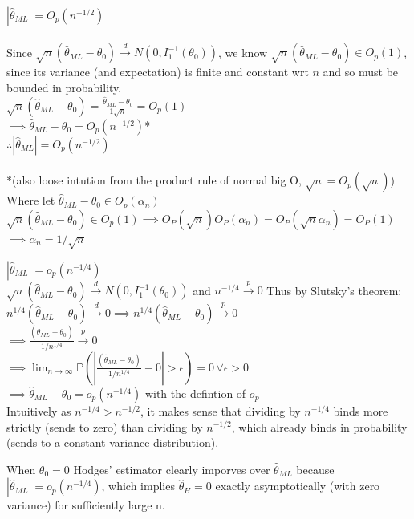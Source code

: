 \documentclass[DIV=14,titlepage=false]{scrreprt}
\begin{document}
\begin{prop}
\(|\hat{\theta}_{ML}|=O_p(n^{-1/2})\)
\\ \\ Since \(\sqrt{n}(\hat{\theta}_{ML}-\theta_0)\xrightarrow{d}N(0,I_1^{-1}(\theta_0))\), we know \(\sqrt{n}(\hat{\theta}_{ML}-\theta_0) \in O_p(1)\), since its variance (and expectation) is finite and constant wrt \(n\) and so must be bounded in probability.
\\ \(\sqrt{n}(\hat{\theta}_{ML}-\theta_0)=\frac{\hat{\theta}_{ML}-\theta_0}{1\sqrt{n}}=O_p(1)\)
\\ \(\implies \hat{\theta}_{ML}-\theta_0=O_p(n^{-1/2})\)* 
\\ \(\therefore |\hat{\theta}_{ML}|=O_p(n^{-1/2})\)
\\ \\ *(also loose intution from the product rule of normal big O, \(\sqrt{n}=O_p({\sqrt{n}})\))
\\ Where let \(\hat{\theta}_{ML}-\theta_0\in O_p(\alpha_n)\)
\\\(\sqrt{n}(\hat{\theta}_{ML}-\theta_0) \in O_p(1) \implies O_P(\sqrt{n})O_P(\alpha_n)=O_P(\sqrt{n}\alpha_n)=O_P(1)\) 
\\ \(\implies \alpha_n=1/\sqrt{n}\)
\end{prop}
\vspace{5mm}
\begin{prop}
\(|\hat{\theta}_{ML}|=o_p(n^{-1/4})\)
\\
\(\sqrt{n}(\hat{\theta}_{ML}-\theta_0)\xrightarrow{d}N(0,I_1^{-1}(\theta_0))\) and \(n^{-1/4}\xrightarrow{p}0\)
Thus by Slutsky's theorem: \(n^{1/4}(\hat{\theta}_{ML}-\theta_0)\xrightarrow{d}0 \implies n^{1/4}(\hat{\theta}_{ML}-\theta_0)\xrightarrow{p}0\)
\\ \(\implies \frac{(\hat{\theta}_{ML}-\theta_0)}{1/n^{1/4}}\xrightarrow{p}0\)
\\ \(\implies \lim_{n\rightarrow\infty}\mathbb{P}(|\frac{(\hat{\theta}_{ML}-\theta_0)}{1/n^{1/4}}-0|>\epsilon)=0 \, \forall \epsilon>0\) 
\\ \(\implies \hat{\theta}_{ML}-\theta_0=o_p(n^{-1/4})\) with the defintion of \(o_p\)
\\ Intuitively as \(n^{-1/4}>n^{-1/2}\), it makes sense that dividing by \(n^{-1/4}\) binds more strictly (sends to zero) than dividing by \(n^{-1/2}\), which already binds in probability (sends to a constant variance distribution).
\end{prop}

When \(\theta_0=0\) Hodges' estimator clearly imporves over \(\hat{\theta}_{ML}\) because \(|\hat{\theta}_{ML}|=o_p(n^{-1/4})\), which implies \(\hat{\theta}_{H}=0\) exactly asymptotically (with zero variance) for sufficiently large n.
\end{document}
